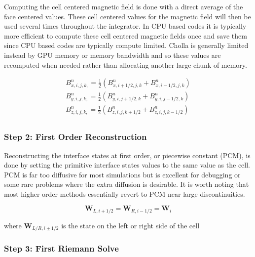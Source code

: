 Computing the cell centered magnetic field is done with a direct average of the face centered values. These cell centered values for the magnetic field will then be used several times throughout the integrator. In CPU based codes it is typically more efficient to compute these cell centered magnetic fields once and save them since CPU based codes are typically compute limited. Cholla is generally limited instead by GPU memory or memory bandwidth and so these values are recomputed when needed rather than allocating another large chunk of memory.

\begin{equation}
    \begin{aligned}
        B^n_{x,i,j,k,} = \frac{1}{2} \left( B^n_{x,i+1/2,j,k} + B^n_{x,i-1/2,j,k} \right) \\
        B^n_{y,i,j,k,} = \frac{1}{2} \left( B^n_{y,i,j+1/2,k} + B^n_{y,i,j-1/2,k} \right) \\
        B^n_{z,i,j,k,} = \frac{1}{2} \left( B^n_{z,i,j,k+1/2} + B^n_{z,i,j,k-1/2} \right) \\
    \end{aligned}
\end{equation}

\subsubsection{Step 2: First Order Reconstruction}
\label{vlct:first-order-reconstruction}

Reconstructing the interface states at first order, or piecewise constant (PCM), is done by setting the primitive interface states values to the same value as the cell. PCM is far too diffusive for most simulations but is excellent for debugging or some rare problems where the extra diffusion is desirable. It is worth noting that most higher order methods essentially revert to PCM near large discontinuities.

\begin{equation}
    \boldsymbol{W}_{L, i+1/2} = \boldsymbol{W}_{R, i-1/2} = \boldsymbol{W}_{i}
\end{equation}

where $ \boldsymbol{W}_{L/R, i\pm1/2} $ is the state on the left or right side of the cell

\subsubsection{Step 3: First Riemann Solve}
\label{vlct:first-riemann-solve}

